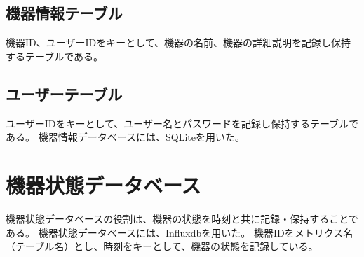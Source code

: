 \subsection{機器情報テーブル}
機器ID、ユーザーIDをキーとして、機器の名前、機器の詳細説明を記録し保持するテーブルである。
\subsection{ユーザーテーブル}
ユーザーIDをキーとして、ユーザー名とパスワードを記録し保持するテーブルである。
機器情報データベースには、SQLiteを用いた。

\section{機器状態データベース}
機器状態データベースの役割は、機器の状態を時刻と共に記録・保持することである。
機器状態データベースには、Influxdbを用いた。
機器IDをメトリクス名（テーブル名）とし、時刻をキーとして、機器の状態を記録している。

